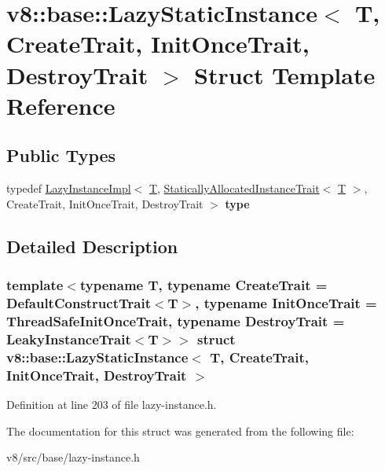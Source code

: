 \hypertarget{structv8_1_1base_1_1LazyStaticInstance}{}\section{v8\+:\+:base\+:\+:Lazy\+Static\+Instance$<$ T, Create\+Trait, Init\+Once\+Trait, Destroy\+Trait $>$ Struct Template Reference}
\label{structv8_1_1base_1_1LazyStaticInstance}
\subsection*{Public Types}
\begin{DoxyCompactItemize}
\item 
\mbox{\label{structv8_1_1base_1_1LazyStaticInstance_ac7d85178e95333cf30b45a2185e7d701}} 
typedef \mbox{\hyperlink{structv8_1_1base_1_1LazyInstanceImpl}{Lazy\+Instance\+Impl}}$<$ \mbox{\hyperlink{classv8_1_1internal_1_1torque_1_1T}{T}}, \mbox{\hyperlink{structv8_1_1base_1_1StaticallyAllocatedInstanceTrait}{Statically\+Allocated\+Instance\+Trait}}$<$ \mbox{\hyperlink{classv8_1_1internal_1_1torque_1_1T}{T}} $>$, Create\+Trait, Init\+Once\+Trait, Destroy\+Trait $>$ {\bfseries type}
\end{DoxyCompactItemize}


\subsection{Detailed Description}
\subsubsection*{template$<$typename T, typename Create\+Trait = Default\+Construct\+Trait$<$\+T$>$, typename Init\+Once\+Trait = Thread\+Safe\+Init\+Once\+Trait, typename Destroy\+Trait = Leaky\+Instance\+Trait$<$\+T$>$$>$\newline
struct v8\+::base\+::\+Lazy\+Static\+Instance$<$ T, Create\+Trait, Init\+Once\+Trait, Destroy\+Trait $>$}



Definition at line 203 of file lazy-\/instance.\+h.



The documentation for this struct was generated from the following file\+:\begin{DoxyCompactItemize}
\item 
v8/src/base/lazy-\/instance.\+h\end{DoxyCompactItemize}
